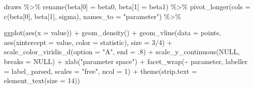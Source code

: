 \documentclass[
  letterpaper,
  DIV=11,
  numbers=noendperiod]{scrartcl}
\newenvironment{Shaded}{\begin{snugshade}}{\end{snugshade}}
\newcommand{\AttributeTok}[1]{\textcolor[rgb]{0.40,0.45,0.13}{#1}}
\newcommand{\ConstantTok}[1]{\textcolor[rgb]{0.56,0.35,0.01}{#1}}
\newcommand{\DecValTok}[1]{\textcolor[rgb]{0.68,0.00,0.00}{#1}}
\newcommand{\FunctionTok}[1]{\textcolor[rgb]{0.28,0.35,0.67}{#1}}
\newcommand{\NormalTok}[1]{\textcolor[rgb]{0.00,0.23,0.31}{#1}}
\newcommand{\OtherTok}[1]{\textcolor[rgb]{0.00,0.23,0.31}{#1}}
\newcommand{\SpecialCharTok}[1]{\textcolor[rgb]{0.37,0.37,0.37}{#1}}
\newcommand{\StringTok}[1]{\textcolor[rgb]{0.13,0.47,0.30}{#1}}
\begin{document}
\begin{Shaded}
\begin{Highlighting}[]
\NormalTok{draws }\SpecialCharTok{\%\textgreater{}\%} 
  \FunctionTok{rename}\NormalTok{(}\StringTok{\textasciigrave{}}\AttributeTok{beta[0]}\StringTok{\textasciigrave{}} \OtherTok{=}\NormalTok{ beta0,}
         \StringTok{\textasciigrave{}}\AttributeTok{beta[1]}\StringTok{\textasciigrave{}} \OtherTok{=}\NormalTok{ beta1) }\SpecialCharTok{\%\textgreater{}\%} 
  \FunctionTok{pivot\_longer}\NormalTok{(}\AttributeTok{cols =} \FunctionTok{c}\NormalTok{(}\StringTok{\textasciigrave{}}\AttributeTok{beta[0]}\StringTok{\textasciigrave{}}\NormalTok{, }\StringTok{\textasciigrave{}}\AttributeTok{beta[1]}\StringTok{\textasciigrave{}}\NormalTok{, sigma), }
               \AttributeTok{names\_to =} \StringTok{"parameter"}\NormalTok{) }\SpecialCharTok{\%\textgreater{}\%} 
  
  \FunctionTok{ggplot}\NormalTok{(}\FunctionTok{aes}\NormalTok{(}\AttributeTok{x =}\NormalTok{ value)) }\SpecialCharTok{+}
  \FunctionTok{geom\_density}\NormalTok{() }\SpecialCharTok{+}
  \FunctionTok{geom\_vline}\NormalTok{(}\AttributeTok{data =}\NormalTok{ points,}
             \FunctionTok{aes}\NormalTok{(}\AttributeTok{xintercept =}\NormalTok{ value, }\AttributeTok{color =}\NormalTok{ statistic),}
             \AttributeTok{size =} \DecValTok{3}\SpecialCharTok{/}\DecValTok{4}\NormalTok{) }\SpecialCharTok{+}
  \FunctionTok{scale\_color\_viridis\_d}\NormalTok{(}\AttributeTok{option =} \StringTok{"A"}\NormalTok{, }\AttributeTok{end =}\NormalTok{ .}\DecValTok{8}\NormalTok{) }\SpecialCharTok{+}
  \FunctionTok{scale\_y\_continuous}\NormalTok{(}\ConstantTok{NULL}\NormalTok{, }\AttributeTok{breaks =} \ConstantTok{NULL}\NormalTok{) }\SpecialCharTok{+}
  \FunctionTok{xlab}\NormalTok{(}\StringTok{"parameter space"}\NormalTok{) }\SpecialCharTok{+}
  \FunctionTok{facet\_wrap}\NormalTok{(}\SpecialCharTok{\textasciitilde{}}\NormalTok{ parameter, }\AttributeTok{labeller =}\NormalTok{ label\_parsed, }\AttributeTok{scales =} \StringTok{"free"}\NormalTok{, }\AttributeTok{ncol =} \DecValTok{1}\NormalTok{) }\SpecialCharTok{+}
  \FunctionTok{theme}\NormalTok{(}\AttributeTok{strip.text =} \FunctionTok{element\_text}\NormalTok{(}\AttributeTok{size =} \DecValTok{14}\NormalTok{))}
\end{Highlighting}
\end{Shaded}
\end{document}

